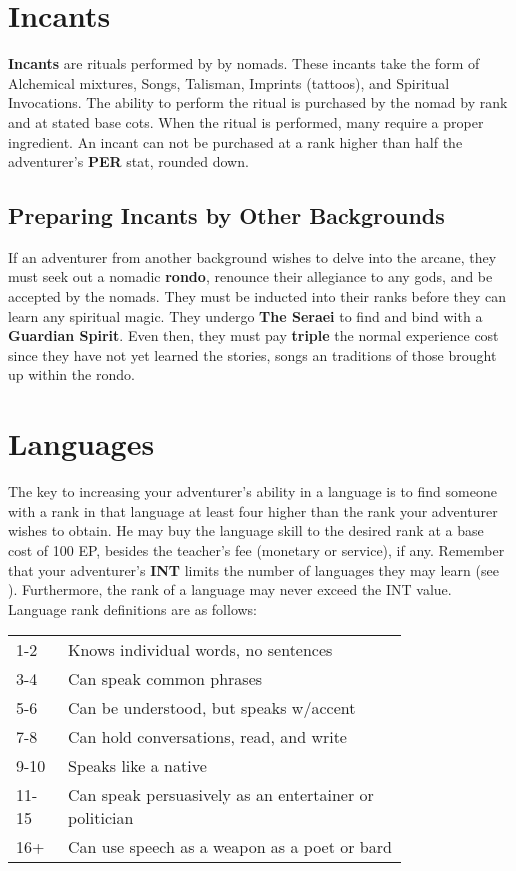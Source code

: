 \begin{multicols*}{2}
\section{Incants}
\textbf{Incants} are rituals performed by by nomads. These
incants take the form of Alchemical mixtures, Songs, Talisman, Imprints (tattoos), and Spiritual Invocations. The ability to perform the ritual is purchased by the nomad by
rank and at stated base cots. When the ritual is performed, many require a proper ingredient. An incant can not be purchased at a rank higher than half the adventurer's \textbf{PER} stat, rounded down.
\subsection{Preparing Incants by Other Backgrounds}
If an adventurer from another background wishes to delve into the arcane, they must seek out a nomadic \textbf{rondo}, renounce their allegiance to any gods, and be accepted by the nomads. They must be inducted into their ranks before they can learn any spiritual magic. They undergo \textbf{The Seraei} to find and bind with a \textbf{Guardian Spirit}. Even then, they must pay \textbf{triple} the normal experience cost since they have not yet learned the stories, songs an traditions of those brought up within the rondo.
\section{Languages}
The key to increasing your adventurer's ability in a language is to find someone with a rank in that language at least four higher than the rank your adventurer wishes to obtain. He may buy the language skill to the desired rank at a base cost of 100 EP, besides the teacher's fee (monetary or service), if any. Remember that your adventurer's \textbf{INT} limits the number of languages they may learn (see \tcpage{\pageref{create-language}}). Furthermore, the rank of a language may never exceed the
INT value. Language rank definitions are as follows:

\begin{normbox}
\begin{tabular}{p{0.085\linewidth} p{0.7\linewidth}}
1-2  & Knows individual words, no sentences\\
3-4  & Can speak common phrases\\
5-6  & Can be understood, but speaks w/accent\\
7-8  & Can hold conversations, read, and write\\
9-10  & Speaks like a native\\
11-15  & Can speak persuasively as an entertainer or politician\\
16+ & Can use speech as a weapon as a poet or bard\\
\end{tabular}
\end{normbox}

\end{multicols*}
